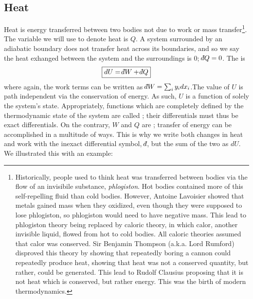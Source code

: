 \documentclass[12pt]{article}
\def\dbar{{\mathchar'26\mkern-12mu d}}
\begin{document}
\subsection{Heat}
Heat is energy transferred between two bodies not due to work or mass transfer\footnote{Historically, people used to think heat was transferred between bodies via the flow of an invisibile substance, \textit{phlogiston}. Hot bodies contained more of this self-repelling fluid than cold bodies. However, Antoine Lavoisier showed that metals gained mass when they oxidized, even though they were supposed to lose phlogiston, so phlogiston would need to have negative mass. This lead to phlogiston theory being replaced by caloric theory, in which calor, another invisible liquid, flowed from hot to cold bodies. All caloric theories assumed that calor was conserved. Sir Benjamin Thompson (a.k.a. Lord Rumford) disproved this theory by showing that repeatedly boring a cannon could repeatedly produce heat, showing that heat was not a conserved quantity, but rather, could be generated. This lead to Rudolf Clausius proposing that it is not heat which is conserved, but rather energy. This was the birth of modern thermodynamics.}.  The variable we will use to denote heat is $Q$.  A system surrounded by an adiabatic boundary does not transfer heat across its boundaries, and so we say the heat exhanged between the system and the surroundings is 0; $\dbar Q = 0$.  The  is
\begin{equation}\boxed{
dU = \dbar W + \dbar Q
}\end{equation}
where again, the work terms can be written as $\dbar W = \sum_i y_i dx_i$.The value of $U$ is path independent via the conservation of energy. As such, $U$ is a function of solely the system's state. Appropriately, functions which are completely defined by the thermodynamic state of the system are called ; their differentials must thus be exact differentials. On the contrary, $W$ and $Q$ are ; transfer of energy can be accomplished in a multitude of ways.  This is why we write both changes in heat and work with the inexact differential symbol, $\dbar$, but the sum of the two as $dU$. We illustrated this with an example:
\end{document}
